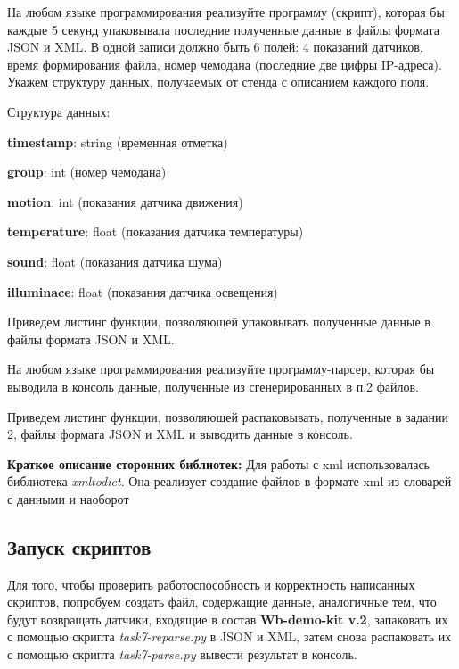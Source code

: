 \documentclass[a4paper,14pt]{extarticle}
\newcommand{\stend}{\textbf{Wb-demo-kit v.2}}
\begin{document}
\begin{problem}
На любом языке программирования реализуйте программу (скрипт), которая бы
каждые 5 секунд упаковывала последние полученные данные в файлы формата
JSON и XML. В одной записи должно быть 6 полей: 4 показаний датчиков, время
формирования файла, номер чемодана (последние две цифры IP-адреса).
\nonum 
Укажем структуру данных, получаемых от стенда с описанием каждого поля.

Структура данных:

\textbf{timestamp}: string (временная отметка)

\textbf{group}: int (номер чемодана)

\textbf{motion}: int (показания датчика движения)

\textbf{temperature}: float (показания датчика температуры)

\textbf{sound}: float (показания датчика шума)

\textbf{illuminace}: float (показания датчика освещения)


Приведем листинг функции, позволяющей упаковывать полученные данные в файлы формата JSON и XML.  

\end{problem}

\begin{problem}
На любом языке программирования реализуйте программу-парсер, которая бы
выводила в консоль данные, полученные из сгенерированных в п.2 файлов.

\nonum Приведем листинг функции, позволяющей распаковывать, полученные в задании 2, файлы формата JSON и XML и выводить данные в консоль.  
\newpage

\end{problem}

\textbf{Краткое описание сторонних библиотек:}
Для работы с xml использовалась библиотека \textit{xmltodict}. Она реализует создание файлов в формате xml из словарей с данными и наоборот

\subsection{Запуск скриптов}
Для того, чтобы проверить работоспособность и корректность написанных скриптов, попробуем создать файл, содержащие данные, аналогичные тем, что будут возвращать датчики, входящие в состав \stend, запаковать их с помощью скрипта \textit{task7-reparse.py} в JSON и XML, затем снова распаковать их с помощью скрипта \textit{task7-parse.py} вывести результат в консоль.
\end{document}
